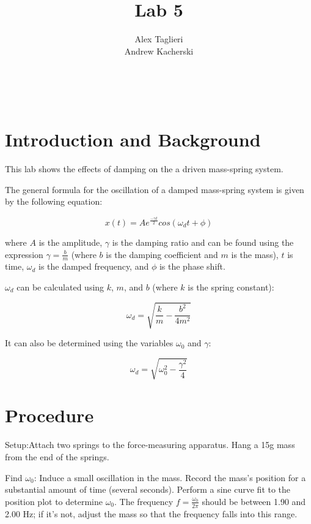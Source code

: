 \documentclass[]{article}
\title{Lab 5}
\author{
	Alex Taglieri
	\\
	Andrew Kacherski
	}
\begin{document}
\maketitle
\newpage
\
\raggedright


\section{Introduction and Background}

This lab shows the effects of damping on the a driven mass-spring system.

The general formula for the oscillation of a damped mass-spring system is given by the following equation:


\begin{equation}\label{uncertaintyLong}
x(t) = Ae^{\frac{-\gamma t}{2}}cos(\omega_d t + \phi)
\end{equation}

where $A$ is the amplitude, $\gamma$ is the damping ratio and can be found using the expression  $\gamma = \frac{b}{m}$ (where $b$ is the damping coefficient and $m$ is the mass), $t$ is time, $\omega_d$ is the damped frequency, and $\phi$ is the phase shift.

$\omega_d$ can be calculated using $k$, $m$, and $b$ (where $k$ is the spring constant):

\begin{equation}
	\omega_d = \sqrt{\frac{k}{m} - \frac{b^2}{4m^2}}
\end{equation}

It can also be determined using the variables $\omega_0$ and $\gamma$:

\begin{equation}
	\omega_d = \sqrt{\omega_0 ^2 - \frac{\gamma^2}{4}}
\end{equation}



\section{Procedure}

Setup:Attach two springs to the force-measuring apparatus. Hang a 15g mass from the end of the springs.
\newline

Find $\omega_0$: Induce a small oscillation in the mass. Record the mass's position for a substantial amount of time (several seconds). Perform a sine curve fit to the position plot to determine $\omega_0$. The frequency $f=\frac{\omega_0}{2\pi}$ should be between 1.90 and 2.00 Hz; if it's not, adjust the mass so that the frequency falls into this range.
\newline
\end{document}
